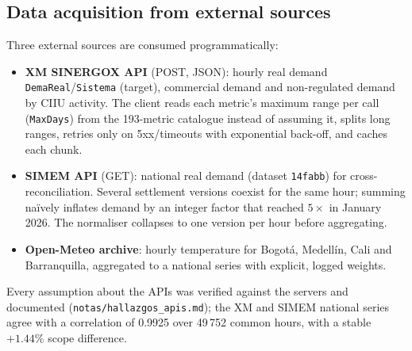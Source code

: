 \documentclass[conference,10pt]{IEEEtran}
\begin{document}
\subsection{Data acquisition from external sources}
Three external sources are consumed programmatically:
\begin{itemize}
\item \textbf{XM SINERGOX API} (POST, JSON): hourly real demand \texttt{DemaReal}/\texttt{Sistema} (target), commercial demand and non-regulated demand by CIIU activity. The client reads each metric's maximum range per call (\texttt{MaxDays}) from the 193-metric catalogue instead of assuming it, splits long ranges, retries only on 5xx/timeouts with exponential back-off, and caches each chunk.
\item \textbf{SIMEM API} (GET): national real demand (dataset \texttt{14fabb}) for cross-reconciliation. Several settlement versions coexist for the same hour; summing naïvely inflates demand by an integer factor that reached $5\times$ in January 2026. The normaliser collapses to one version per hour before aggregating.
\item \textbf{Open-Meteo archive}: hourly temperature for Bogot\'a, Medell\'in, Cali and Barranquilla, aggregated to a national series with explicit, logged weights.
\end{itemize}
Every assumption about the APIs was verified against the servers and documented (\texttt{notas/hallazgos\_apis.md}); the XM and SIMEM national series agree with a correlation of 0.9925 over 49\,752 common hours, with a stable $+1.44\%$ scope difference.
\end{document}
